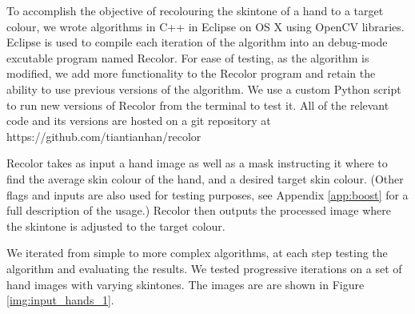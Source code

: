 To accomplish the objective of recolouring the skintone of a hand to a target colour, we wrote algorithms in C++ in Eclipse on OS X using OpenCV libraries. Eclipse is used to compile each iteration of the algorithm into an debug-mode excutable program named Recolor. For ease of testing, as the algorithm is modified, we add more functionality to the Recolor program and retain the ability to use previous versions of the algorithm. We use a custom Python script to run new versions of Recolor from the terminal to test it. All of the relevant code and its versions are hosted on a git repository at https://github.com/tiantianhan/recolor

Recolor takes as input a hand image as well as a mask instructing it where to find the average skin colour of the hand, and a desired target skin colour. (Other flags and inputs are also used for testing purposes, see Appendix \ref{app:boost} for a full description of the usage.) Recolor then outputs the processed image where the skintone is adjusted to the target colour.

We iterated from simple to more complex algorithms, at each step testing the algorithm and evaluating the results. We tested progressive iterations on a set of hand images with varying skintones. The images are are shown in Figure \ref{img:input_hands_1}.


